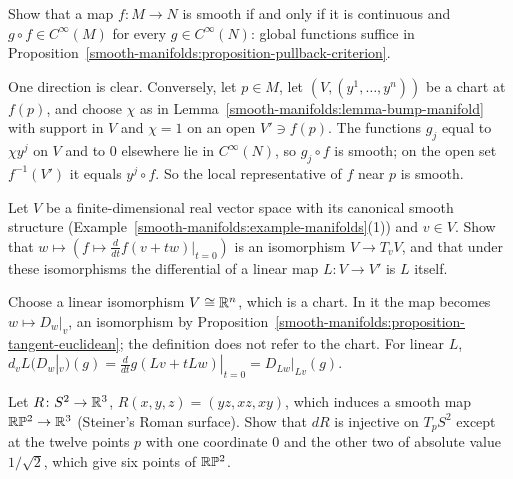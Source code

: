 \begin{exercise}\label{smooth-manifolds:exercise-smooth-via-functions}
Show that a map $f \colon M \to N$ is smooth if and only if it is continuous and $g \circ f \in C^\infty(M)$ for every $g \in C^\infty(N)$: global functions
suffice in Proposition~\ref{smooth-manifolds:proposition-pullback-criterion}.
\end{exercise}

\begin{solution}
One direction is clear. Conversely, let $p \in M$, let $(V, (y^1, \ldots, y^n))$ be a chart at $f(p)$, and choose $\chi$ as in
Lemma~\ref{smooth-manifolds:lemma-bump-manifold} with support in $V$ and $\chi = 1$ on an open $V' \ni f(p)$. The functions $g_j$ equal to $\chi y^j$ on $V$ and to $0$
elsewhere lie in $C^\infty(N)$, so $g_j \circ f$ is smooth; on the open set $f^{-1}(V')$ it equals $y^j \circ f$. So the local representative of $f$ near $p$ is
smooth.
\end{solution}

\begin{exercise}\label{smooth-manifolds:exercise-tangent-vector-space}
Let $V$ be a finite-dimensional real vector space with its canonical smooth structure (Example~\ref{smooth-manifolds:example-manifolds}(1)) and $v \in V$. Show
that $w \mapsto (f \mapsto \frac{d}{dt}f(v + tw)|_{t=0})$ is an isomorphism $V \to T_vV$, and that under these isomorphisms the differential of a linear map
$L \colon V \to V'$ is $L$ itself.
\end{exercise}

\begin{solution}
Choose a linear isomorphism $V \cong \mathbb{R}^n$, which is a chart. In it the map becomes $w \mapsto D_w|_v$, an isomorphism by
Proposition~\ref{smooth-manifolds:proposition-tangent-euclidean}; the definition does not refer to the chart. For linear $L$,
$d_vL(D_w|_v)(g) = \frac{d}{dt}g(Lv + tLw)|_{t=0} = D_{Lw}|_{Lv}(g)$.
\end{solution}

\begin{exercise}\label{smooth-manifolds:exercise-roman-surface}
Let $R \colon S^2 \to \mathbb{R}^3$, $R(x, y, z) = (yz, xz, xy)$, which induces a smooth map $\mathbb{R}\mathbb{P}^2 \to \mathbb{R}^3$ (Steiner's Roman surface). Show that $dR$ is injective on $T_pS^2$ except at the twelve points $p$ with one coordinate
$0$ and the other two of absolute value $1/\sqrt2$, which give six points of $\mathbb{R}\mathbb{P}^2$.
\end{exercise}

